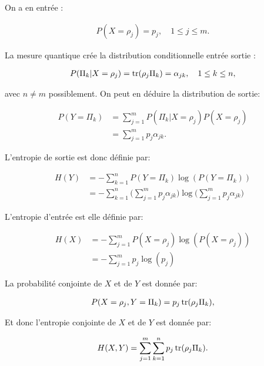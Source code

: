 On a en entrée :

\begin{align}
    P(X = \rho_j) = p_j, \quad 1 \leq j \leq m.
\end{align}

La mesure quantique crée la distribution conditionnelle entrée sortie :

\begin{align}
    P(\Pi_k | X = \rho_j) = \operatorname{tr}(\rho_j \Pi_k) = \alpha_{jk}, \quad 1 \leq k \leq n,
\end{align}

avec $n \neq m$ possiblement. On peut en déduire la distribution de sortie:

\begin{align}
    P(Y = \Pi_k) &= \displaystyle \sum_{j = 1}^{m} P(\Pi_k | X = \rho_j)P(X = \rho_j) \\
    &= \displaystyle \sum_{j = 1}^{m} p_j \alpha_{jk}.
\end{align}

L'entropie de sortie est donc définie par: 

\begin{align}
    H(Y) &= -\displaystyle \sum_{k = 1}^{n} P(Y = \Pi_k) \log(P(Y = \Pi_k)) \\
    &= -\displaystyle \sum_{k = 1}^{n} \big(\displaystyle \sum_{j = 1}^{m} p_j \alpha_{jk}\big) \log\big(\displaystyle \sum_{j = 1}^{m} p_j \alpha_{jk}\big)
\end{align}

L'entropie d'entrée est elle définie par:

\begin{align}
    H(X) &= -\displaystyle \sum_{j = 1}^{m} P(X = \rho_j) \log(P(X = \rho_j)) \\
    &= -\displaystyle \sum_{j = 1}^{m} p_j \log(p_j)
\end{align}

La probabilité conjointe de $X$ et de $Y$ est donnée par: 

\begin{align}
    P(X = \rho_j, Y = \Pi_k) = p_j \operatorname{tr}(\rho_j \Pi_k),
\end{align}

Et donc l'entropie conjointe de $X$ et de $Y$ est donnée par:

\begin{align}
    H(X, Y) = \displaystyle \sum_{j=1}^{m} \displaystyle \sum_{k=1}^{n} p_j \operatorname{tr}(\rho_j \Pi_k).
\end{align}

